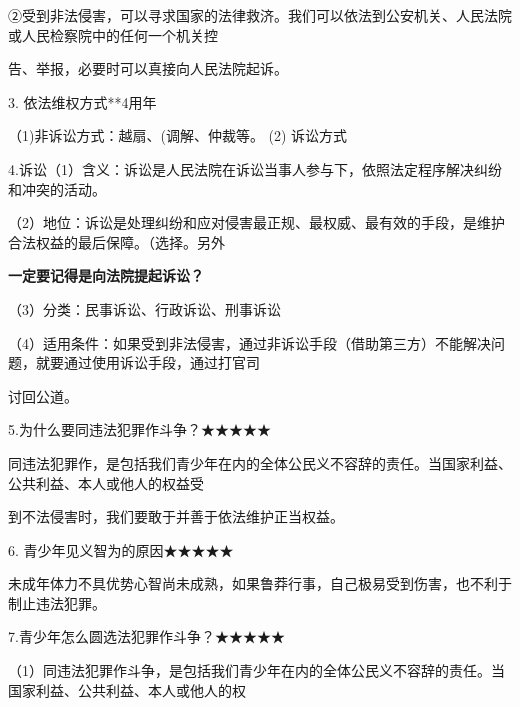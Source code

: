 \documentclass[lang=cn,11pt]{elegantbook}
\newcommand{\daofasym}[1]{{\daofasymbolfont #1}}
\newcommand{\daofasym}[1]{#1}
\begin{document}
\daofasym{②}受到非法侵害，可以寻求国家的法律救济。我们可以依法到公安机关、人民法院或人民检察院中的任何一个机关控\par

告、举报，必要时可以真接向人民法院起诉。\par

3. 依法维权方式**4用年\par

（1)非诉讼方式：越扇、(调解、仲裁等。 (2) 诉讼方式\par

4.诉讼（1）含义：诉讼是人民法院在诉讼当事人参与下，依照法定程序解决纠纷和冲突的活动。\par

（2）地位：诉讼是处理纠纷和应对侵害最正规、最权威、最有效的手段，是维护合法权益的最后保障。（选择。另外\par

\textbf{一定要记得是向法院提起诉讼？}\par

（3）分类：民事诉讼、行政诉讼、刑事诉讼\par

（4）适用条件：如果受到非法侵害，通过非诉讼手段（借助第三方）不能解决问题，就要通过使用诉讼手段，通过打官司\par

讨回公道。\par

5.为什么要同违法犯罪作斗争？\daofasym{★}\daofasym{★}\daofasym{★}\daofasym{★}\daofasym{★}\par

同违法犯罪作，是包括我们青少年在内的全体公民义不容辞的责任。当国家利益、公共利益、本人或他人的权益受\par

到不法侵害时，我们要敢于并善于依法维护正当权益。\par

6. 青少年见义智为的原因\daofasym{★}\daofasym{★}\daofasym{★}\daofasym{★}\daofasym{★}\par

未成年体力不具优势心智尚未成熟，如果鲁莽行事，自己极易受到伤害，也不利于制止违法犯罪。\par

7.青少年怎么圆选法犯罪作斗争？\daofasym{★}\daofasym{★}\daofasym{★}\daofasym{★}\daofasym{★}\par

（1）同违法犯罪作斗争，是包括我们青少年在内的全体公民义不容辞的责任。当国家利益、公共利益、本人或他人的权\par
\end{document}
